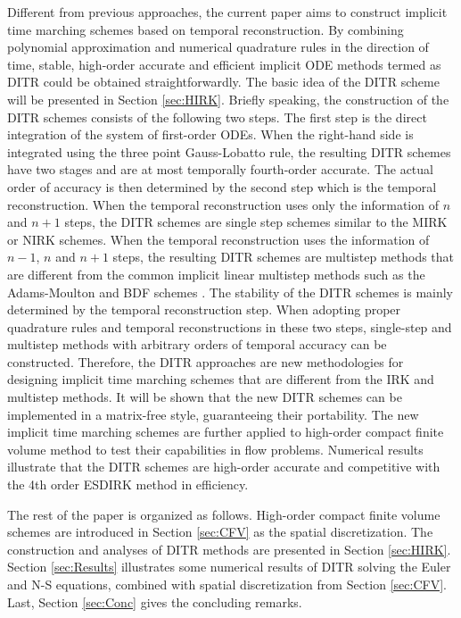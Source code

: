 Different from previous approaches,
the current paper aims to construct implicit
time marching schemes based on temporal
reconstruction.
By combining polynomial approximation and
numerical quadrature rules in the direction of time,
stable,
high-order accurate and efficient implicit ODE methods
termed as DITR could be
obtained straightforwardly.
The basic idea of the DITR scheme will be presented
in Section \ref{sec:HIRK}.
Briefly speaking, the construction of the DITR
schemes consists of the following two steps.
The first step is the direct integration of the
system of first-order ODEs.
When the right-hand side is integrated using the
three point Gauss-Lobatto rule, the resulting DITR
schemes have two stages and are at most temporally fourth-order accurate.
The actual order of accuracy is then determined by
the second step which is the temporal reconstruction.
When the temporal reconstruction uses only the information of $n$
and $n+1$ steps, the DITR schemes are single step schemes
similar to the MIRK or NIRK schemes.
When the temporal reconstruction uses the information of $n-1$, $n$ and $n+1$ steps,
the resulting DITR schemes are multistep methods that are
different from the common implicit linear multistep
methods such as
the Adams-Moulton and BDF schemes \cite{wanner1996solving}.
The stability of the DITR
schemes is mainly determined by the temporal
reconstruction step.
When adopting proper quadrature rules
and temporal reconstructions in these two steps, single-step
and multistep methods with arbitrary orders of temporal
accuracy can be constructed. Therefore, the DITR approaches
are new methodologies for designing implicit time marching
schemes that are different from the IRK and multistep
methods.
It will be shown that the new DITR schemes can be implemented
in a matrix-free style, guaranteeing their portability.
The new implicit time marching schemes are further applied to
high-order compact finite volume method to
test their capabilities in flow problems. 
Numerical results
illustrate that the DITR schemes are high-order accurate
and competitive with the 4th order ESDIRK method in efficiency.


The rest of the paper is organized as follows.
High-order compact finite volume schemes
are introduced in Section \ref{sec:CFV} as the spatial discretization.
The construction and analyses of DITR methods are presented
in Section \ref{sec:HIRK}.
Section \ref{sec:Results} illustrates some numerical results of
DITR solving the Euler and N-S equations, combined with
spatial  discretization from Section \ref{sec:CFV}.
Last, Section \ref{sec:Conc} gives the concluding remarks.


